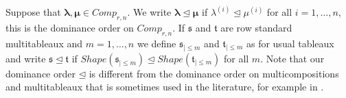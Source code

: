 \documentclass[10pt,a4,twoside,hidelinks,rm]{article}
\newcommand{\bT}{\pmb{\mathfrak{t}}}
\newcommand{\Bs}{\pmb{\mathfrak{s}}}
\newcommand{\MC}{{ {Comp}}_{r,n}}
\newcommand\blambda{{\boldsymbol\lambda}}
\newcommand\bmu{{\boldsymbol\mu}}
\theoremstyle{plain}
\begin{document}
Suppose that $\blambda, \bmu \in \MC $.
We write $\blambda \unlhd \bmu$ if
$\lambda^{(i)}\unlhd \mu^{(i)}$ for all $i=1,\ldots,n$, this is the 
dominance order on $ \MC$. If $\Bs $ and $\bT$ are row standard
{multitableaux} and $m=1,\ldots,n$ we define $\Bs_{\mid \le m} $ and $ \bT_{\mid \le m}$
as for usual tableaux and
write $\Bs \unlhd \bT$ if $Shape(\Bs_{\mid \le m}) \unlhd
Shape(\bT_{\mid \le m}) $ for all $ m$.
Note that our dominance order $ \unlhd $ is different
from the dominance order on multicompositions and multitableaux that is
{\color{black}sometimes used} in the literature, for example in \cite{DJM}. %
\end{document}
